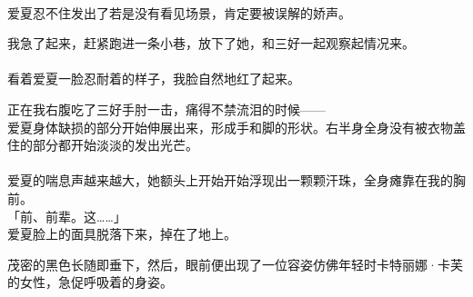 \\

爱夏忍不住发出了若是没有看见场景，肯定要被误解的娇声。

我急了起来，赶紧跑进一条小巷，放下了她，和三好一起观察起情况来。\\

\\

看着爱夏一脸忍耐着的样子，我脸自然地红了起来。

正在我右腹吃了三好手肘一击，痛得不禁流泪的时候——\\

爱夏身体缺损的部分开始伸展出来，形成手和脚的形状。右半身全身没有被衣物盖住的部分都开始淡淡的发出光芒。\\

\\

爱夏的喘息声越来越大，她额头上开始开始浮现出一颗颗汗珠，全身瘫靠在我的胸前。\\

「前、前辈。这……」\\

爱夏脸上的面具脱落下来，掉在了地上。

茂密的黑色长随即垂下，然后，眼前便出现了一位容姿仿佛年轻时卡特丽娜·卡芙的女性，急促呼吸着的身姿。\\

